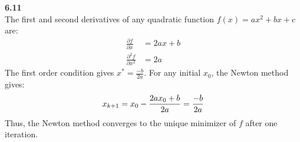 \documentclass[letterpaper,12pt]{article}
\theoremstyle{definition}
\begin{document}
\noindent\textbf{6.11}\\
The first and second derivatives of any quadratic function $f(x) = ax^2 + bx + c$ are:
\begin{align*}
\frac{\partial f}{\partial x} &= 2ax + b\\
\frac{\partial^2 f}{\partial x^2} &= 2a
\end{align*}
The first order condition gives $x^* = \frac{-b}{2a}$. For any initial $x_0$, the Newton method gives:
\begin{equation*}
x_{k+1} = x_0 - \frac{2ax_0 + b}{2a} = \frac{-b}{2a}\\
\end{equation*}
Thus, the Newton method converges to the unique minimizer of $f$ after one iteration.
\end{document}
